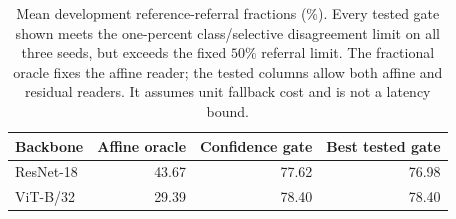 \begin{table}[htbp]
\centering\small
\caption{Mean development reference-referral fractions (\%). Every tested gate shown
meets the one-percent class/selective disagreement limit on all three seeds,
but exceeds the fixed $50\%$ referral limit. The fractional oracle fixes the
affine reader; the tested columns allow both affine and residual readers.
It assumes unit fallback cost and is not a latency bound.}
\label{tab:conditional_reference}
\begin{tabular}{lrrr}\toprule
Backbone & Affine oracle & Confidence gate & Best tested gate \\
\midrule
ResNet-18 & 43.67 & 77.62 & 76.98 \\
ViT-B/32 & 29.39 & 78.40 & 78.40 \\
\bottomrule\end{tabular}
\end{table}
